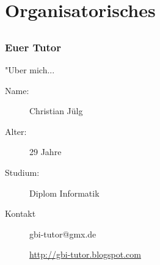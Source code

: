 













\section[Organisation]{Organisatorisches}
\subsection*{}
\begin{frame}
\frametitle{Euer Tutor}
        \begin{block}{"Uber mich...}
                \begin{description}
                        \item[Name:] Christian Jülg
                        \item[Alter:] 29 Jahre
                        \item[Studium:] Diplom Informatik
                \end{description}
        \end{block}

        \vspace{2ex}

        \begin{block}{Kontakt}
                \begin{description}
                        \item[] gbi-tutor@gmx.de
                        \item[] \url{http://gbi-tutor.blogspot.com}
                \end{description}
        \end{block}
\end{frame}

